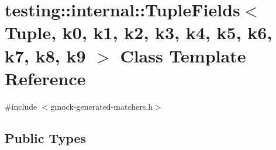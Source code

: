 \hypertarget{classtesting_1_1internal_1_1_tuple_fields}{}\section{testing\+::internal\+::Tuple\+Fields$<$ Tuple, k0, k1, k2, k3, k4, k5, k6, k7, k8, k9 $>$ Class Template Reference}
\label{classtesting_1_1internal_1_1_tuple_fields}


{\ttfamily \#include $<$gmock-\/generated-\/matchers.\+h$>$}

\subsection*{Public Types}

